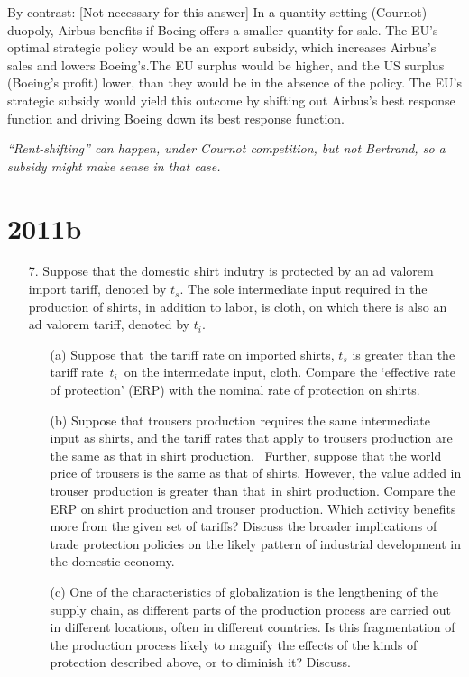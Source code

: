 \begin{enumerate}
 By contrast: [Not necessary for this answer] In a quantity-setting (Cournot) duopoly, Airbus benefits if Boeing offers a smaller quantity for sale. The EU's optimal strategic policy would be an export subsidy, which increases Airbus's sales and lowers Boeing's.The EU surplus would be higher, and the US surplus (Boeing's profit) lower, than they would be in the absence of the policy. The EU's strategic subsidy would yield this outcome by shifting out Airbus's best response function and driving Boeing down its best response function.

\emph{“Rent-shifting” can happen, under Cournot competition, but not Bertrand, so a subsidy might make sense in that case.}
	
	
\end{enumerate}

\newpage

\section*{2011b}


\begin{enumerate}
\item [7.] Suppose that the domestic shirt indutry is protected by an ad
valorem import tariff, denoted by $t_{s}$. The sole intermediate input
required in the production of shirts, in addition to labor, is cloth, on
which there is also an ad valorem tariff, denoted by $t_{i}$.
\begin{enumerate}
	\item [(a)] Suppose that\ the tariff rate on imported shirts, $t_{s}$ is greater than the tariff rate\ $t_{i}$\ on the intermedate input, cloth. Compare the `effective rate of protection' (ERP) with the nominal rate of protection on shirts. 
	\item [(b)] Suppose that trousers production requires the same intermediate input as shirts, and the tariff rates that apply to trousers production are the same as that in shirt production. \ Further, suppose that the world price of trousers is the same as that of shirts. However, the value added in trouser production is greater than that\ in shirt production. Compare the ERP on shirt production and trouser production. Which activity benefits more from the given set of tariffs? Discuss the broader implications of trade protection policies on the likely pattern of industrial development in the domestic economy. 
	\item [(c)] One of the characteristics of globalization is the lengthening of the supply chain, as different parts of the production process are carried out in different locations, often in different countries. Is this fragmentation of the production process likely to magnify the effects of the kinds of protection described above, or to diminish it? Discuss.

\end{enumerate}
\end{enumerate}



